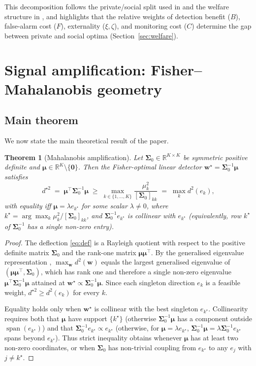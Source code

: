 \documentclass[11pt,a4paper]{article}
\newtheorem{theorem}{Theorem}
\theoremstyle{definition}
\theoremstyle{remark}
\newcommand{\R}{\mathbb{R}}
\newcommand{\1}{\mathbf{1}}
\newcommand{\w}{\mathbf{w}}
\newcommand{\mmu}{\boldsymbol{\mu}}
\newcommand{\Sig}{\boldsymbol{\Sigma}}
\newcommand{\trans}{^{\!\top}}
\begin{document}
This decomposition follows the private/social split used in \citet{xiong2024information} and the welfare structure in \citet{goldstein2008manipulation}, and highlights that the relative weights of detection benefit ($B$), false-alarm cost ($F$), externality ($\xi,\zeta$), and monitoring cost ($C$) determine the gap between private and social optima (Section~\ref{sec:welfare}).

\section{Signal amplification: Fisher--Mahalanobis geometry}
\label{sec:amp}

\subsection{Main theorem}
We now state the main theoretical result of the paper.

\begin{theorem}[Mahalanobis amplification]
\label{thm:amp}
Let $\Sig_0\in\R^{K\times K}$ be symmetric positive definite and $\mmu\in\R^K\setminus\{\mathbf{0}\}$. Then the Fisher-optimal linear detector $\w^\star=\Sig_0^{-1}\mmu$ satisfies
\begin{equation}
d^{\star 2} \;=\; \mmu\trans\Sig_0^{-1}\mmu \;\ge\; \max_{k\in\{1,\ldots,K\}} \frac{\mu_k^2}{[\Sig_0]_{kk}} \;=\; \max_k d^2(e_k),
\label{eq:amp}
\end{equation}
with equality iff $\mmu=\lambda e_{k^\star}$ for some scalar $\lambda\ne 0$, where $k^\star=\arg\max_k \mu_k^2/[\Sig_0]_{kk}$, and $\Sig_0^{-1}e_{k^\star}$ is collinear with $e_{k^\star}$ (equivalently, row $k^\star$ of $\Sig_0^{-1}$ has a single non-zero entry).
\end{theorem}

\begin{proof}
The deflection \eqref{eq:def} is a Rayleigh quotient with respect to the positive definite matrix $\Sig_0$ and the rank-one matrix $\mmu\mmu\trans$. By the generalised eigenvalue representation \citep[Ch.~3]{luenberger1984linear}, $\max_\w d^2(\w)$ equals the largest generalised eigenvalue of $(\mmu\mmu\trans,\Sig_0)$, which has rank one and therefore a single non-zero eigenvalue $\mmu\trans\Sig_0^{-1}\mmu$ attained at $\w^\star\propto\Sig_0^{-1}\mmu$. Since each singleton direction $e_k$ is a feasible weight, $d^{\star 2}\ge d^2(e_k)$ for every $k$.

Equality holds only when $\w^\star$ is collinear with the best singleton $e_{k^\star}$. Collinearity requires both that $\mmu$ have support $\{k^\star\}$ (otherwise $\Sig_0^{-1}\mmu$ has a component outside $\operatorname{span}(e_{k^\star})$) and that $\Sig_0^{-1}e_{k^\star}\propto e_{k^\star}$ (otherwise, for $\mmu=\lambda e_{k^\star}$, $\Sig_0^{-1}\mmu=\lambda\Sig_0^{-1}e_{k^\star}$ spans beyond $e_{k^\star}$). Thus strict inequality obtains whenever $\mmu$ has at least two non-zero coordinates, or when $\Sig_0$ has non-trivial coupling from $e_{k^\star}$ to any $e_{j}$ with $j\ne k^\star$.
\end{proof}
\end{document}
